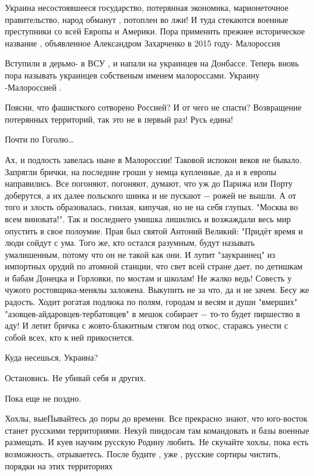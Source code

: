 
Украина несостоявшееся государство, потерянная экономика, марионеточное
правительство, народ обманут , потоплен во лжи! И туда стекаются военные
преступники со всей Европы и Америки. Пора применить прежнее историческое
название , объявленное Александром Захарченко в 2015 году- Малороссия


Вступили в дерьмо- в ВСУ , и напали на украинцев на Донбассе. Теперь вновь пора
называть украинцев собственым именем малороссами. Украину -Малороссией .


Поясни, что фашисткого сотворено Россией? И от чего не спасти? Возвращение
потерянных территорий, так это не в первый раз!  Русь едина!

Почти по Гоголю… 

Ах, и подлость завелась ныне в Малороссии! Таковой испокон веков не бывало.
Запрягли брички, на последние гроши у немца купленные, да и в европы
направились. Все погоняют, погоняют, думают, что уж до Парижа или Порту
доберутся, а их далее польского шинка и не пускают − рожей не вышли. А от того
и злость образовалась, гнилая, кипучая, но не на себя глупых. "Москва во всем
виновата!". Так и последнего умишка лишились и возжаждали весь мир опустить в
свое полоумие. Прав был святой Антоний Великий: "Придёт время и люди сойдут с
ума. Того же, кто остался разумным, будут называть умалишенным, потому что он
не такой как они. И лупит "заукраинец" из импортных орудий по атомной станции,
что свет всей стране дает, по детишкам и бабам Донецка и Горловки, по мостам и
школам! Не жалко ведь! Совесть у чужого ростовщика-менялы заложена. Выкупить не
за что, да и не зачем. Бесу же радость. Ходит рогатая подлюка по полям, городам
и весям и души "вмерших" "азовцев-айдаровцев-тербатовцев" в мешок собирает −
то-то будет пиршество в аду! И летит бричка с жовто-блакитным стягом под откос,
стараясь унести с собой всех, кто к ней прикоснется. 

Куда несешься, Украина? 

Остановись. 
Не убивай себя и других. 

Пока еще не поздно. 


Хохлы, выеПывайтесь до поры до времени. Все прекрасно знают, что юго-восток
станет русскими территориями. Некуй пиндосам там командовать и базы военные
размещать. И куев научим русскую Родину любить. Не скучайте хохлы, пока есть
возможность, отрываетесь. После будите , уже , русские сортиры чистить, порядки
на этих территориях 

